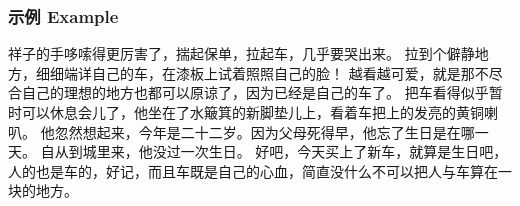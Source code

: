 \documentclass[a4paper]{article}
\begin{document}
    \subsubsection{示例 Example}
        祥子的手哆嗦得更厉害了，揣起保单，拉起车，几乎要哭出来。
        拉到个僻静地方，细细端详自己的车，\cite{laoshe}在漆板上试着照照自己的脸！
        越看越可爱，就是那不尽合自己的理想的地方也都可以原谅了，因为已经是自己的车了。
        把车看得似乎暂时可以休息会儿了，他坐在了水簸箕的新脚垫儿上，看着车把上的发亮的黄铜喇叭。
        他忽然想起来，今年是二十二岁\cite{einstein}。因为父母死得早，他忘了生日是在哪一天。
        自从到城里来，他没过一次生日。
        好吧，今天买上了新车，就算是生日\cite{knuthwebsite}吧，人的也是车的，好记，而且车既是自己的心血，简直没什么不可以把人与车算在一块的地方。

\newpage


\printglossary[title={词汇表 Notation}, nonumberlist]
\glsaddall[] %
\end{document}
